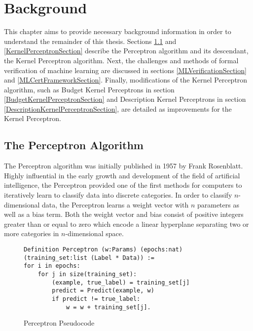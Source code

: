 \chapter{Background}\label{BackgroundChapter}
This chapter aims to provide necessary background information in order to understand the remainder of this thesis. Sections \ref{PerceptronSection} and \ref{KernelPerceptronSection} describe the Perceptron algorithm and its descendant, the Kernel Perceptron algorithm. Next, the challenges and methods of formal verification of machine learning are discussed in sections \ref{MLVerificationSection} and \ref{MLCertFrameworkSection}. Finally, modifications of the Kernel Perceptron algorithm, such as Budget Kernel Perceptrons in section \ref{BudgetKernelPerceptronSection} and Description Kernel Perceptrons in section \ref{DescriptionKernelPerceptronSection}, are detailed as improvements for the Kernel Perceptron.
\section{The Perceptron Algorithm}\label{PerceptronSection}
The Perceptron algorithm was initially published in 1957 by Frank Rosenblatt. Highly influential in the early growth and development of the field of artificial intelligence, the Perceptron \cite{Ros57} provided one of the first methods for computers to iteratively learn to classify data into discrete categories. In order to classify $n$-dimensional data, the Perceptron learns a weight vector with $n$ parameters as well as a bias term. Both the weight vector and bias consist of positive integers greater than or equal to zero which encode a linear hyperplane separating two or more categories in $n$-dimensional space.

\begin{figure}
    \caption{Perceptron Pseudocode}
    \label{PerceptronPseudo}
    \begin{lstlisting}
Definition Perceptron (w:Params) (epochs:nat) (training_set:list (Label * Data)) :=
for i in epochs:
    for j in size(training_set):
        (example, true_label) = training_set[j]
        predict = Predict(example, w)
        if predict != true_label:
            w = w + training_set[j].
    \end{lstlisting}
\end{figure}

